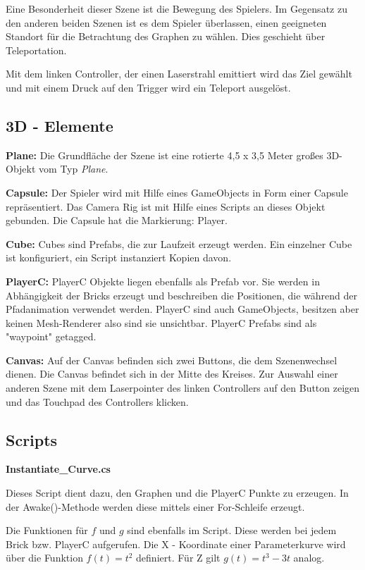 Eine Besonderheit dieser Szene ist die Bewegung des Spielers. Im Gegensatz zu den anderen beiden Szenen ist es dem Spieler überlassen, einen geeigneten Standort für die Betrachtung des Graphen zu wählen. Dies geschieht über Teleportation. 

Mit dem linken Controller, der einen Laserstrahl emittiert wird das Ziel gewählt und mit einem Druck auf den Trigger wird ein Teleport ausgelöst. 


\subsection{3D - Elemente}

\textbf{Plane: } Die Grundfläche der Szene ist eine rotierte 4,5 x 3,5 Meter großes 3D-Objekt vom Typ \emph{Plane}.

\textbf{Capsule: } Der Spieler wird mit Hilfe eines GameObjects in Form einer Capsule repräsentiert. Das Camera Rig ist mit Hilfe eines Scripts an dieses Objekt gebunden. Die Capsule hat die Markierung: Player.

\textbf{Cube: } Cubes sind Prefabs, die zur Laufzeit erzeugt werden. Ein einzelner Cube ist konfiguriert, ein Script instanziert Kopien davon.

\textbf{PlayerC: } PlayerC Objekte liegen ebenfalls als Prefab vor. Sie werden in Abhängigkeit der Bricks erzeugt und beschreiben die Positionen, die während der Pfadanimation verwendet werden. PlayerC sind auch GameObjects, besitzen aber keinen Mesh-Renderer also sind sie unsichtbar. PlayerC Prefabs sind als "waypoint" getagged.

\textbf{Canvas: } Auf der Canvas befinden sich zwei Buttons, die dem Szenenwechsel dienen. Die Canvas befindet sich in der Mitte des Kreises. Zur Auswahl einer anderen Szene mit dem Laserpointer des linken Controllers auf den Button zeigen und das Touchpad des Controllers klicken. 

\subsection{Scripts}
\textbf{Instantiate\_Curve.cs}

Dieses Script dient dazu, den Graphen und die PlayerC Punkte zu erzeugen. In der Awake()-Methode werden diese mittels einer For-Schleife erzeugt. 

Die Funktionen für $f$ und $g$ sind ebenfalls im Script. Diese werden bei jedem Brick bzw. PlayerC aufgerufen. Die X - Koordinate einer Parameterkurve wird über die Funktion $ f(t) = t^{2} $ definiert. Für Z gilt $g(t) = t^{3} - 3t$ analog. 



